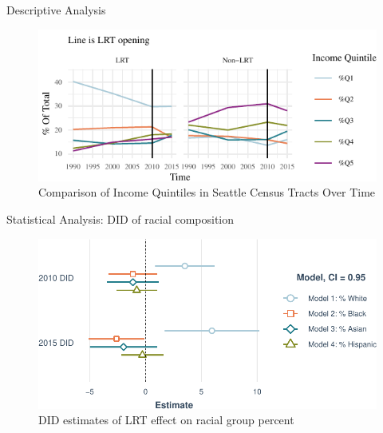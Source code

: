 \documentclass[11pt,ignorenonframetext,]{beamer}
\begin{document}
\begin{frame}{Descriptive Analysis}
\protect\hypertarget{descriptive-analysis-1}{}

\begin{figure}

{\centering \includegraphics{csde_talk_files/figure-beamer/unnamed-chunk-4-1} 

}

\caption{Comparison of Income Quintiles in Seattle Census Tracts Over Time}\label{fig:unnamed-chunk-4}
\end{figure}

\end{frame}

\begin{frame}{Statistical Analysis: DID of racial composition}
\protect\hypertarget{statistical-analysis-did-of-racial-composition}{}

\begin{figure}
\centering
\includegraphics{csde_talk_files/figure-beamer/unnamed-chunk-9-1.pdf}
\caption{DID estimates of LRT effect on racial group percent}
\end{figure}

\end{frame}
\end{document}
